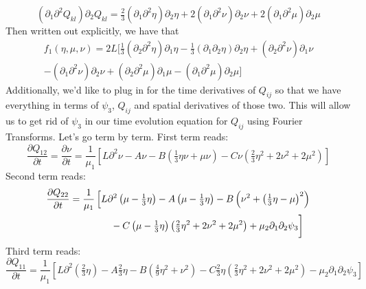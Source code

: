 \documentclass[reqno]{article}
\begin{document}
	\begin{equation}
		\left( \partial_1\partial^2 Q_{kl}\right)\partial_2 Q_{kl} = \tfrac23\left( \partial_1\partial^2 \eta \right)\partial_2\eta + 2\left( \partial_1\partial^2\nu \right)\partial_2 \nu + 2\left( \partial_1\partial^2 \mu \right)\partial_2\mu
	\end{equation}
	Then written out explicitly, we have that
	\begin{multline}
		f_1(\eta, \mu, \nu) = 2L \bigg[ \tfrac13 \left( \partial_2\partial^2 \eta \right) \partial_1 \eta - \tfrac13 \left( \partial_1\partial_2 \eta\right)\partial_2 \eta + \left(\partial_2 \partial^2 \nu\right)\partial_1 \nu \\ - \left(\partial_1 \partial^2 \nu\right)\partial_2 \nu + \left(\partial_2 \partial^2 \mu\right)\partial_1 \mu - \left(\partial_1 \partial^2 \mu\right)\partial_2 \mu \bigg]
	\end{multline}
	Additionally, we'd like to plug in for the time derivatives of $Q_{ij}$ so that we have everything in terms of $\psi_3$, $Q_{ij}$ and spatial derivatives of those two. This will allow us to get rid of $\psi_3$ in our time evolution equation for $Q_{ij}$ using Fourier Transforms.  Let's go term by term. First term reads:
	\begin{equation}
		\frac{\partial Q_{12}}{\partial t} = \frac{\partial \nu}{\partial t} = \frac{1}{\mu_1} \left[ L\partial^2 \nu - A\nu - B\left(\tfrac{1}{3}\eta\nu + \mu\nu\right) - C\nu\left( \tfrac{2}{3}\eta^2 + 2\nu^2 + 2\mu^2 \right) \right]
	\end{equation}
	Second term reads:
	\begin{equation}
	\begin{split}
		\frac{\partial Q_{22}}{\partial t} &= \frac{1}{\mu_1}\left[ L\partial^2 \left( \mu - \tfrac{1}{3}\eta \right) - A\left( \mu - \tfrac{1}{3}\eta \right) - B\left( \nu^2 + 
		\left( \tfrac{1}{3}\eta - \mu \right)^2 \right)\right. \\
		&\qquad\qquad\left.\vphantom{\frac13^2}- C\left( \mu - \tfrac{1}{3}\eta \right)\left( \tfrac{2}{3}\eta^2 + 2\nu^2 + 2\mu^2 \right) + \mu_2 \partial_1\partial_2 \psi_3 \right]
	\end{split}
	\end{equation}
	Third term reads:
	\begin{equation}
		\frac{\partial Q_{11}}{\partial t} = \frac{1}{\mu_1} \left[L\partial^2 \left( \tfrac{2}{3}\eta \right) - A \tfrac{2}{3}\eta - B\left( \tfrac{4}{9}\eta^2 + \nu^2 \right) - C \tfrac{2}{3}\eta \left( \tfrac{2}{3}\eta^2 + 2\nu^2 + 2\mu^2 \right) - \mu_2 \partial_1\partial_2 \psi_3 \right]
	\end{equation}
\end{document}
